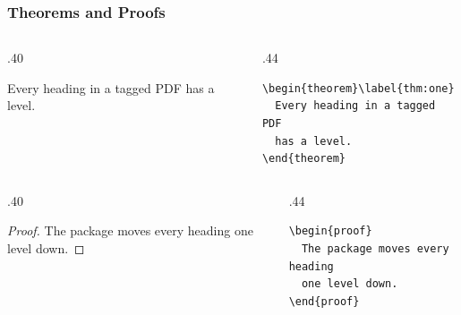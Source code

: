 \documentclass{ltx-talk}
\begin{document}
\begin{frame*}
  \frametitle{Theorems and Proofs}
  \begin{columns}
    \begin{column}{.40\textwidth}
      \begin{theorem}\label{thm:one}
        Every heading in a tagged PDF has a level.
      \end{theorem}
    \end{column}
    \begin{column}{.44\textwidth}
\small
\begin{verbatim}
\begin{theorem}\label{thm:one}
  Every heading in a tagged PDF
  has a level.
\end{theorem}
\end{verbatim}
    \end{column}
  \end{columns}

  \begin{columns}
    \begin{column}{.40\textwidth}
      \begin{proof}
        The package moves every heading one level down.
      \end{proof}
    \end{column}
    \begin{column}{.44\textwidth}
\small
\begin{verbatim}
\begin{proof}
  The package moves every heading
  one level down.
\end{proof}
\end{verbatim}
    \end{column}
  \end{columns}
\end{frame*}
\end{document}
